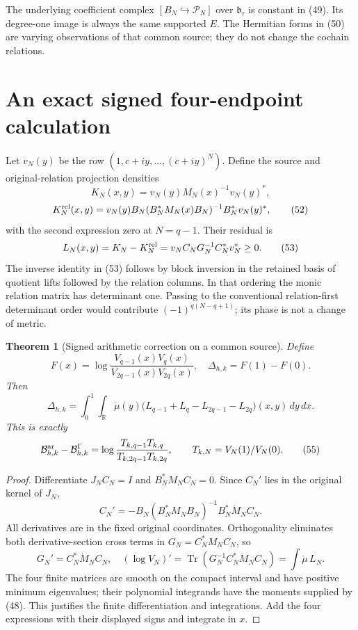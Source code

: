 \documentclass[11pt]{article}
\newtheorem{theorem}{Theorem}[section]
\begin{document}
The underlying coefficient complex $[B_N\hookrightarrow\mathcal P_N]$ over $\mathfrak b_\tau$ is constant in (49). Its degree-one image is always the same supported $E$. The Hermitian forms in (50) are varying observations of that common source; they do not change the cochain relations.

\section{An exact signed four-endpoint calculation}
Let $v_N(y)$ be the row $(1,c+iy,\ldots,(c+iy)^N)$. Define the source and original-relation projection densities
\[
 K_N(x,y)=v_N(y)M_N(x)^{-1}v_N(y)^*,
\]
\[
 K_N^{\rm rel}(x,y)
 =v_N(y)B_N(B_N^*M_N(x)B_N)^{-1}B_N^*v_N(y)^*,
 \tag{52}
\]
with the second expression zero at $N=q-1$. Their residual is
\[
 L_N(x,y)=K_N-K_N^{\rm rel}
  =v_NC_NG_N^{-1}C_N^*v_N^*\ge0.
 \tag{53}
\]
The inverse identity in (53) follows by block inversion in the retained basis of quotient lifts followed by the relation columns. In that ordering the monic relation matrix has determinant one. Passing to the conventional relation-first determinant order would contribute $(-1)^{q(N-q+1)}$; its phase is not a change of metric.

\begin{theorem}[Signed arithmetic correction on a common source]
Define
\[
 F(x)=\log\frac{V_{q-1}(x)V_q(x)}{V_{2q-1}(x)V_{2q}(x)},
 \quad \Delta_{h,k}=F(1)-F(0).
\]
Then
\[
 \boxed{\Delta_{h,k}
   =\int_0^1\!\int_{\mathbb R}\dot\mu(y)
       \bigl(L_{q-1}+L_q-L_{2q-1}-L_{2q}\bigr)(x,y)\,dy\,dx.}
 \tag{54}
\]
This is exactly
\[
 \mathcal B^{\rm ar}_{h,k}-\mathcal B^\Gamma_{h,k}
 =\log\frac{T_{k,q-1}T_{k,q}}{T_{k,2q-1}T_{k,2q}},
 \qquad T_{k,N}=V_N(1)/V_N(0).
 \tag{55}
\]
\end{theorem}
\begin{proof}
Differentiate $J_NC_N=I$ and $B_N^*M_NC_N=0$. Since $C_N'$ lies in the original kernel of $J_N$,
\[
 C_N'=-B_N(B_N^*M_NB_N)^{-1}B_N^*\dot M_NC_N.
 \tag{56}
\]
All derivatives are in the fixed original coordinates. Orthogonality eliminates both derivative-section cross terms in $G_N=C_N^*M_NC_N$, so
\[
 G_N'=C_N^*\dot M_NC_N,
 \quad(\log V_N)'=\operatorname{Tr}(G_N^{-1}C_N^*\dot M_NC_N)
                 =\int\dot\mu\,L_N.
 \tag{57}
\]
The four finite matrices are smooth on the compact interval and have positive minimum eigenvalues; their polynomial integrands have the moments supplied by (48). This justifies the finite differentiation and integrations. Add the four expressions with their displayed signs and integrate in $x$.
\end{proof}
\end{document}

